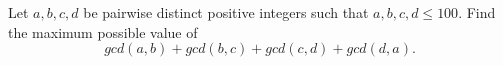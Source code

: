 Let $a, b, c, d$ be pairwise distinct positive integers such that $a, b, c, d \le 100$. Find the maximum possible value of \[gcd(a, b) + gcd(b, c) + gcd(c, d) + gcd(d, a).\]

